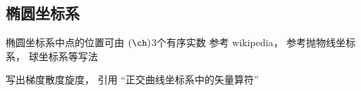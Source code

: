\begin{issues}
\issueDraft
\end{issues}
\subsection{椭圆坐标系}
椭圆坐标系中点的位置可由 $(\ch)$3个有序实数
参考 wikipedia， 参考抛物线坐标系， 球坐标系等写法

写出梯度散度旋度， 引用 “正交曲线坐标系中的矢量算符”
